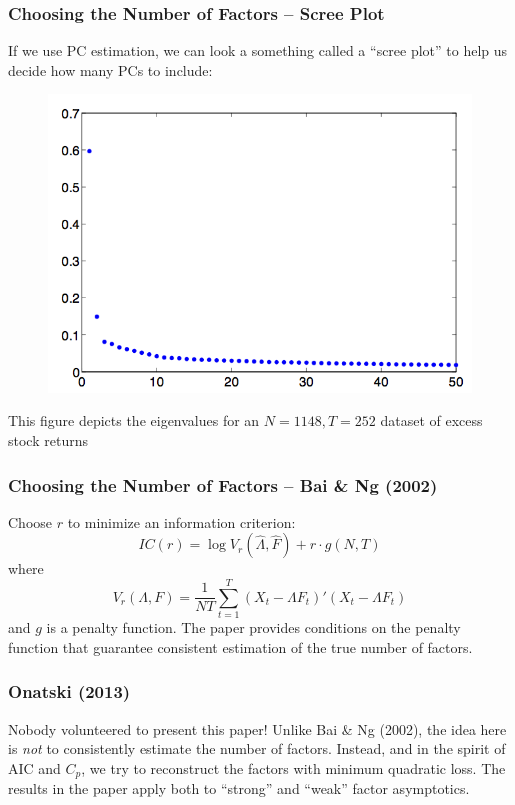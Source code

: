 \documentclass[handout]{beamer}
\begin{document}
\begin{frame}[c]\frametitle{Choosing the Number of Factors -- Scree Plot}
    
If we use PC estimation, we can look a something called a ``scree plot'' to help us decide how many PCs to include:
\begin{figure}
	\centering
	\includegraphics[scale =0.3]{../img/scree}
\end{figure}
This figure depicts the eigenvalues for an $N=1148, T = 252$ dataset of excess stock returns
\end{frame}
\begin{frame}
	\frametitle{Choosing the Number of Factors -- Bai \& Ng (2002)}

Choose $r$ to minimize an information criterion:
$$IC(r) = \log V_r(\widehat{\Lambda}, \widehat{F}) + r \cdot g(N,T)$$
where
	$$V_r(\Lambda, F) = \frac{1}{NT}\sum_{t=1}^T (X_t - \Lambda F_t)'(X_t - \Lambda F_t)$$
and $g$ is a penalty function. The paper provides conditions on the penalty function that guarantee consistent estimation of the true number of factors. 
\end{frame}
\begin{frame}
	\frametitle{Onatski (2013)}
	Nobody volunteered to present this paper! Unlike Bai \& Ng (2002), the idea here is \emph{not} to consistently estimate the number of factors. Instead, and in the spirit of AIC and $C_p$, we try to reconstruct the factors with minimum quadratic loss. The results in the paper apply both to ``strong'' and ``weak'' factor asymptotics.
\end{frame}
\end{document}
